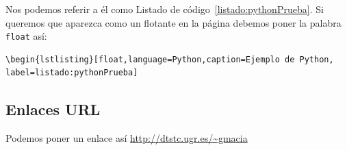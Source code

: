 Nos podemos referir a él como Listado de código~\ref{listado:pythonPrueba}. 
Si queremos que aparezca como un flotante en la página debemos poner la palabra \texttt{float} así: 
\begin{verbatim}
\begin{lstlisting}[float,language=Python,caption=Ejemplo de Python, 
label=listado:pythonPrueba]
\end{verbatim}


\subsection*{Enlaces URL}
Podemos poner un enlace así \url{http://dtstc.ugr.es/~gmacia}